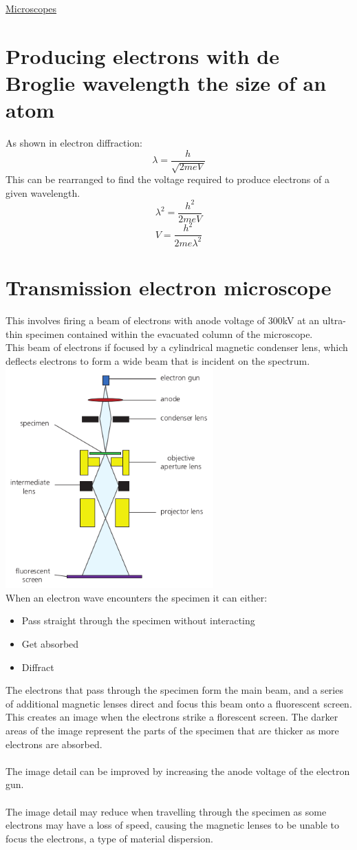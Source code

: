 \documentclass[12pt]{article}
\begin{document}
\begin{center}
\underline{\huge Microscopes}
\end{center}
\section{Producing electrons with de Broglie wavelength the size of an atom}
As shown in electron diffraction:
$$\lambda=\frac{h}{\sqrt{2meV}}$$
This can be rearranged to find the voltage required to produce electrons of a given wavelength. 
$$\lambda^2=\frac{h^2}{2meV}$$
$$V=\frac{h^2}{2me\lambda^2}$$
\section{Transmission electron microscope}
This involves firing a beam of electrons with anode voltage of 300kV at an ultra-thin specimen contained within the evacuated column of the microscope.\\
This beam of electrons if focused by a cylindrical magnetic condenser lens, which deflects electrons to form a wide beam that is incident on the spectrum.\\
\includegraphics[width=8cm]{tem.png}\\
When an electron wave encounters the specimen it can either:
\begin{itemize}
\item Pass straight through the specimen without interacting
\item Get absorbed
\item Diffract
\end{itemize}
The electrons that pass through the specimen form the main beam, and a series of additional magnetic lenses direct and focus this beam onto a fluorescent screen. This creates an image when the electrons strike a florescent screen. The darker areas of the image represent the parts of the specimen that are thicker as more electrons are absorbed.\\
\\
The image detail can be improved by increasing the anode voltage of the electron gun.\\
\\
The image detail may reduce when travelling through the specimen as some electrons may have a loss of speed, causing the magnetic lenses to be unable to focus the electrons, a type of material dispersion.
\end{document}

